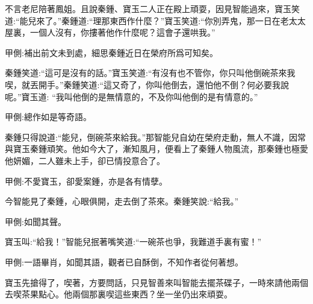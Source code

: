 \begin{parag}
    不言老尼陪著鳳姐。且說秦鍾、寶玉二人正在殿上頑耍，因見智能過來，寶玉笑道:“能兒來了。”秦鍾道:“理那東西作什麼？”寶玉笑道:“你別弄鬼，那一日在老太太屋裏，一個人沒有，你摟著他作什麼呢？這會子還哄我。”\begin{note}甲側:補出前文未到處，細思秦鍾近日在榮府所爲可知矣。\end{note}秦鍾笑道:“這可是沒有的話。”寶玉笑道:“有沒有也不管你，你只叫他倒碗茶來我喫，就丟開手。”秦鍾笑道:“這又奇了，你叫他倒去，還怕他不倒？何必要我說呢。”寶玉道: “我叫他倒的是無情意的，不及你叫他倒的是有情意的。”\begin{note}甲側:總作如是等奇語。\end{note}秦鍾只得說道:“能兒，倒碗茶來給我。”那智能兒自幼在榮府走動，無人不識，因常與寶玉秦鍾頑笑。他如今大了，漸知風月，便看上了秦鍾人物風流，那秦鍾也極愛他妍媚，二人雖未上手，卻已情投意合了。\begin{note}甲側:不愛寶玉，卻愛案鍾，亦是各有情孽。\end{note}今智能見了秦鍾，心眼俱開，走去倒了茶來。秦鍾笑說:“給我。”\begin{note}甲側:如聞其聲。\end{note}寶玉叫:“給我！”智能兒抿著嘴笑道:“一碗茶也爭，我難道手裏有蜜！”\begin{note}甲側:一語畢肖，如聞其語，觀者已自酥倒，不知作者從何著想。\end{note}寶玉先搶得了，喫著，方要問話，只見智善來叫智能去擺茶碟子，一時來請他兩個去喫茶果點心。他兩個那裏喫這些東西？坐一坐仍出來頑耍。
\end{parag}


